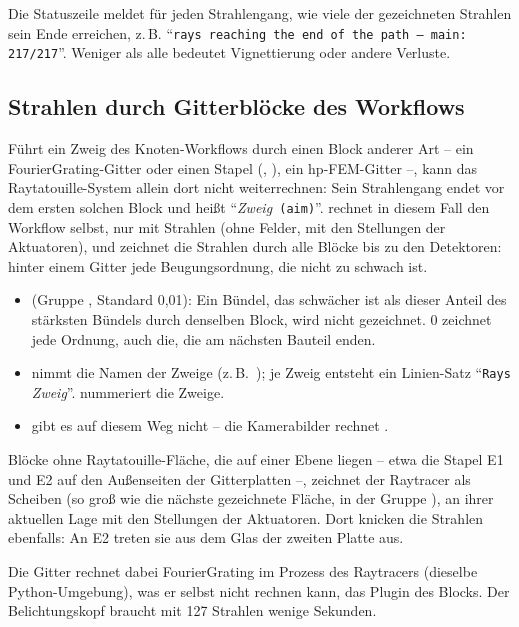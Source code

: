Die Statuszeile meldet für jeden Strahlengang, wie viele der gezeichneten Strahlen sein Ende
erreichen, z.\,B. \enquote{\texttt{rays reaching the end of the path – main: 217/217}}. Weniger
als alle bedeutet Vignettierung oder andere Verluste.

\subsection{Strahlen durch Gitterblöcke des Workflows}\label{sec:rt-strahlen-workflow}

Führt ein Zweig des Knoten-Workflows durch einen Block anderer Art -- ein FourierGrating-Gitter
oder einen Stapel (, ), ein hp-FEM-Gitter --, kann das
Raytatouille-System allein dort nicht weiterrechnen: Sein Strahlengang endet vor dem ersten
solchen Block und heißt \enquote{\textit{Zweig}\texttt{ (aim)}}.  rechnet in
diesem Fall den Workflow selbst, nur mit Strahlen (ohne Felder, mit den Stellungen der
Aktuatoren), und zeichnet die Strahlen durch alle Blöcke bis zu den Detektoren: hinter einem Gitter
jede Beugungsordnung, die nicht zu schwach ist.

\begin{itemize}
  \item {} (Gruppe , Standard 0,01): Ein Bündel, das schwächer
    ist als dieser Anteil des stärksten Bündels durch denselben Block, wird nicht gezeichnet. 0
    zeichnet jede Ordnung, auch die, die am nächsten Bauteil enden.
  \item {} nimmt die Namen der Zweige (z.\,B.\ ); je Zweig entsteht ein
    Linien-Satz \enquote{\texttt{Rays }\textit{Zweig}}.   nummeriert die
    Zweige.
  \item {} gibt es auf diesem Weg nicht -- die Kamerabilder rechnet
    .
\end{itemize}

Blöcke ohne Raytatouille-Fläche, die auf einer Ebene liegen -- etwa die Stapel E1 und E2 auf den
Außenseiten der Gitterplatten --, zeichnet der Raytracer als Scheiben (so groß wie die nächste
gezeichnete Fläche, in der Gruppe ), an ihrer aktuellen Lage mit den
Stellungen der Aktuatoren. Dort knicken die Strahlen ebenfalls: An E2 treten sie aus dem Glas der
zweiten Platte aus.

Die Gitter rechnet dabei FourierGrating im Prozess des Raytracers (dieselbe Python-Umgebung), was
er selbst nicht rechnen kann, das Plugin des Blocks. Der Belichtungskopf
 braucht mit 127 Strahlen wenige Sekunden.

